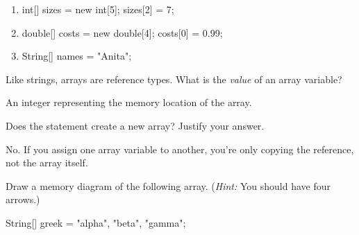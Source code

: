 \begin{minipage}{0.46\linewidth}

\begin{enumerate}

\item
\begin{javalst}
int[] sizes = new int[5];
sizes[2] = 7;
\end{javalst}

\item
\begin{javalst}
double[] costs = new double[4];
costs[0] = 0.99;
\end{javalst}

\item
\begin{javalst}
String[] names = {"Anita"};
\end{javalst}

\end{enumerate}

\end{minipage}
\hfill
\begin{minipage}{0.53\linewidth}
\end{minipage}


\Q Like strings, arrays are reference types. What is the {\it value} of an array variable?

\begin{answer}[3em]
An integer representing the memory location of the array.
\end{answer}


\Q \label{nocopy}
Does the statement  create a new array? Justify your answer.

\begin{answer}[3em]
No. If you assign one array variable to another, you're only copying the reference, not the array itself.
\end{answer}


\Q \label{draw3str}
Draw a memory diagram of the following array.
(\textit{Hint:} You should have four arrows.)

\begin{javalst}
String[] greek = {"alpha", "beta", "gamma"};
\end{javalst}

\vspace{1em}
\hspace{2em}
